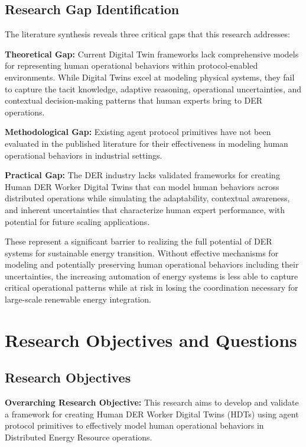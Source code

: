 \documentclass[12pt,a4paper]{article}
\begin{document}
\subsection{Research Gap Identification}

The literature synthesis reveals three critical gaps that this research addresses:

\textbf{Theoretical Gap:} Current Digital Twin frameworks lack comprehensive models for representing human operational behaviors within protocol-enabled environments. While Digital Twins excel at modeling physical systems, they fail to capture the tacit knowledge, adaptive reasoning, operational uncertainties, and contextual decision-making patterns that human experts bring to DER operations.

\textbf{Methodological Gap:} Existing agent protocol primitives have not been evaluated in the published literature for their effectiveness in modeling human operational behaviors in industrial settings.

\textbf{Practical Gap:} The DER industry lacks validated frameworks for creating Human DER Worker Digital Twins that can model human behaviors across distributed operations while simulating the adaptability, contextual awareness, and inherent uncertainties that characterize human expert performance, with potential for future scaling applications.

These represent a significant barrier to realizing the full potential of DER systems for sustainable energy transition. Without effective mechanisms for modeling and potentially preserving human operational behaviors including their uncertainties, the increasing automation of energy systems is less able to capture critical operational patterns while at risk in losing the coordination necessary for large-scale renewable energy integration.

\section{Research Objectives and Questions}
\label{sec:objectives}

\subsection{Research Objectives}

\textbf{Overarching Research Objective:} This research aims to develop and validate a framework for creating Human DER Worker Digital Twins (HDTs) using agent protocol primitives to effectively model human operational behaviors in Distributed Energy Resource operations.
\end{document}
